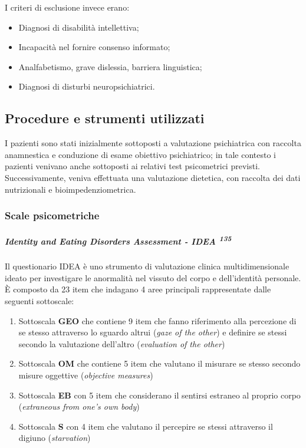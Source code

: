 \documentclass[12pt]{article}
\makeatletter
\newcommand{\cslcitation}[2]
 {\protect\hyper@linkstart{cite}{citeproc_bib_item_#1}#2\hyper@linkend}
\makeatother
\begin{document}
I criteri di esclusione invece erano:
\begin{itemize}
\item Diagnosi di disabilità intellettiva;
\item Incapacità nel fornire consenso informato;
\item Analfabetismo, grave dislessia, barriera linguistica;
\item Diagnosi di disturbi neuropsichiatrici.
\end{itemize}
\subsection{Procedure e strumenti utilizzati}
\label{sec:orgafb2229}
I pazienti sono stati inizialmente sottoposti a valutazione psichiatrica con raccolta anamnestica e conduzione di esame obiettivo psichiatrico; in tale contesto i pazienti venivano anche sottoposti ai relativi test psicometrici previsti.
Successivamente, veniva effettuata una valutazione dietetica, con raccolta dei dati nutrizionali e bioimpedenziometrica.
\subsubsection{Scale psicometriche}
\label{sec:org9fee2ea}
\subparagraph{Identity and Eating Disorders Assessment - IDEA \textsuperscript{\cslcitation{135}{135}}}
\label{sec:orgb8e20c3}
Il questionario IDEA è uno strumento di valutazione clinica multidimensionale ideato per investigare le anormalità nel vissuto del corpo e dell'identità personale.
È composto da 23 item che indagano 4 aree principali rappresentate dalle seguenti sottoscale:
\begin{enumerate}
\item Sottoscala \textbf{GEO} che contiene 9 item che fanno riferimento alla percezione di se stesso attraverso lo sguardo altrui (\emph{gaze of the other}) e definire se stessi secondo la valutazione dell'altro (\emph{evaluation of the other})
\item Sottoscala \textbf{OM} che contiene 5 item che valutano il misurare se stesso secondo misure oggettive (\emph{objective measures})
\item Sottoscala \textbf{EB} con 5 item che considerano il sentirsi estraneo al proprio corpo (\emph{extraneous from one's own body})
\item Sottoscala \textbf{S} con 4 item che valutano il percepire se stessi attraverso il digiuno (\emph{starvation})
\end{enumerate}
\end{document}
